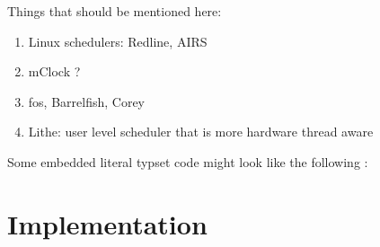 \documentclass[letterpaper,twocolumn,10pt]{article}
\begin{document}
Things that should be mentioned here:
\begin{enumerate}
\item Linux schedulers: Redline, AIRS
\item mClock ?
\item fos, Barrelfish, Corey
\item Lithe: user level scheduler that is more hardware thread aware
\end{enumerate}

Some embedded literal typset code might 
look like the following :

\section{Implementation}

\begin{figure}[t]
  \begin{center}

\end{center}
\end{figure}
\end{document}

